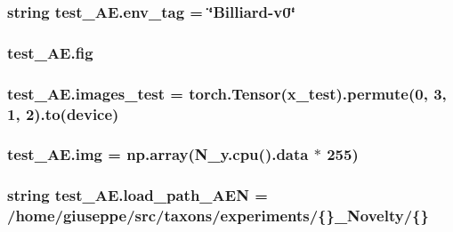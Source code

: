 \subsubsection[{\texorpdfstring{env\+\_\+tag}{env_tag}}]{\setlength{\rightskip}{0pt plus 5cm}string test\+\_\+\+A\+E.\+env\+\_\+tag = \char`\"{}Billiard-\/v0\char`\"{}}\hypertarget{namespacetest___a_e_ad4e9f164dde3e575cfd777341ed3bacd}{}\label{namespacetest___a_e_ad4e9f164dde3e575cfd777341ed3bacd}
\subsubsection[{\texorpdfstring{fig}{fig}}]{\setlength{\rightskip}{0pt plus 5cm}test\+\_\+\+A\+E.\+fig}\hypertarget{namespacetest___a_e_aa94c34d93f296e05338e67fe2404636e}{}\label{namespacetest___a_e_aa94c34d93f296e05338e67fe2404636e}
\subsubsection[{\texorpdfstring{images\+\_\+test}{images_test}}]{\setlength{\rightskip}{0pt plus 5cm}test\+\_\+\+A\+E.\+images\+\_\+test = torch.\+Tensor({\bf x\+\_\+test}).permute(0, 3, 1, 2).to({\bf device})}\hypertarget{namespacetest___a_e_ad4d403402a170260faa8678ef573efa4}{}\label{namespacetest___a_e_ad4d403402a170260faa8678ef573efa4}
\subsubsection[{\texorpdfstring{img}{img}}]{\setlength{\rightskip}{0pt plus 5cm}test\+\_\+\+A\+E.\+img = np.\+array(N\+\_\+y.\+cpu().data $\ast$ 255)}\hypertarget{namespacetest___a_e_a128dceb0115720115990ec4001397d18}{}\label{namespacetest___a_e_a128dceb0115720115990ec4001397d18}
\subsubsection[{\texorpdfstring{load\+\_\+path\+\_\+\+A\+EN}{load_path_AEN}}]{\setlength{\rightskip}{0pt plus 5cm}string test\+\_\+\+A\+E.\+load\+\_\+path\+\_\+\+A\+EN = \textquotesingle{}/home/giuseppe/src/taxons/experiments/\{\}\+\_\+\+Novelty/\{\}\textquotesingle{}}\hypertarget{namespacetest___a_e_a55778c18eb71346ce25752299cffa2c7}{}\label{namespacetest___a_e_a55778c18eb71346ce25752299cffa2c7}
